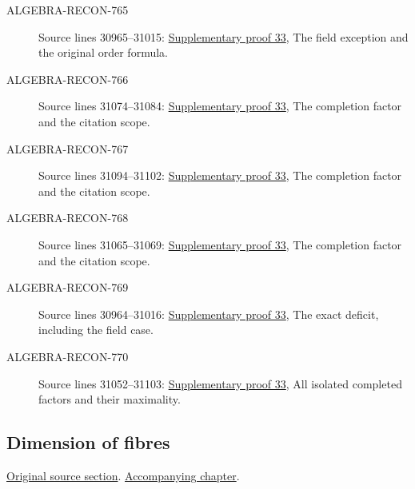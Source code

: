 \begin{description}
\item[ALGEBRA-RECON-765] Source lines 30965--31015: \hyperlink{algebra_zariski_applications_notes_20260928}{Supplementary proof 33}, The field exception and the original order formula.
\item[ALGEBRA-RECON-766] Source lines 31074--31084: \hyperlink{algebra_zariski_applications_notes_20260928}{Supplementary proof 33}, The completion factor and the citation scope.
\item[ALGEBRA-RECON-767] Source lines 31094--31102: \hyperlink{algebra_zariski_applications_notes_20260928}{Supplementary proof 33}, The completion factor and the citation scope.
\item[ALGEBRA-RECON-768] Source lines 31065--31069: \hyperlink{algebra_zariski_applications_notes_20260928}{Supplementary proof 33}, The completion factor and the citation scope.
\item[ALGEBRA-RECON-769] Source lines 30964--31016: \hyperlink{algebra_zariski_applications_notes_20260928}{Supplementary proof 33}, The exact deficit, including the field case.
\item[ALGEBRA-RECON-770] Source lines 31052--31103: \hyperlink{algebra_zariski_applications_notes_20260928}{Supplementary proof 33}, All isolated completed factors and their maximality.
\end{description}

\subsection{Dimension of fibres}
\hypertarget{algebra-source-section-dimension-fibres}{}
\noindent\href{https://github.com/stacks/stacks-project/blob/a04446e57ec1fbc252a871afcec7752fb2807b14/algebra.tex\#L31140}{Original source section}. \href{algebra.pdf\#nameddest=section-dimension-fibres}{Accompanying chapter}.

